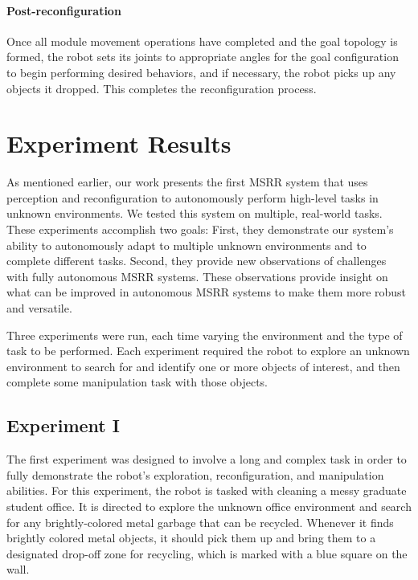 \documentclass[conference]{IEEEtran}
\begin{document}
\paragraph{Post-reconfiguration} Once all module movement operations have completed and the goal topology is formed, the robot sets its joints to appropriate angles for the goal configuration to begin performing desired behaviors, and if necessary, the robot picks up any objects it dropped. This completes the reconfiguration process. 


\section{Experiment Results}
\label{sec:experiments}
%

As mentioned earlier, our work presents the first MSRR system that uses perception and reconfiguration to autonomously perform high-level tasks in unknown environments. We tested this system on multiple, real-world tasks. These experiments accomplish two goals: First, they demonstrate our system's ability to autonomously adapt to multiple unknown environments and to complete different tasks. Second, they provide new observations of challenges with fully autonomous MSRR systems. These observations provide insight on what can be improved in autonomous MSRR systems to make them more robust and versatile.

Three experiments were run, each time varying the environment and the type of task to be performed. Each experiment required the robot to explore an unknown environment to search for and identify one or more objects of interest, and then complete some manipulation task with those objects.

\subsection{Experiment I}

The first experiment was designed to involve a long and complex task in order to fully demonstrate the robot's exploration, reconfiguration, and manipulation abilities. For this experiment, the robot is tasked with cleaning a messy graduate student office.  It is directed to explore the unknown office environment and search for any brightly-colored metal garbage that can be recycled.  Whenever it finds brightly colored metal objects, it should pick them up and bring them to a designated drop-off zone for recycling, which is marked with a blue square on the wall.
\end{document}
